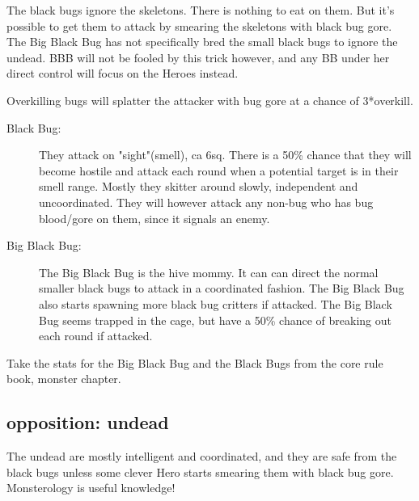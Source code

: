 The black bugs ignore the skeletons. There is nothing to eat on them. But it's possible to get them to attack by smearing the skeletons with black bug gore. The Big Black Bug has not specifically bred the small black bugs to ignore the undead. BBB will not be fooled by this trick however, and any BB under her direct control will focus on the Heroes instead.

Overkilling bugs will splatter the attacker with bug gore at a chance of 3*overkill.


\begin{description}

\item[Black Bug:] They attack on "sight"(smell), ca 6sq. There is a 50\% chance that they will become hostile and attack each round when a potential target is in their smell range. Mostly they skitter around slowly, independent and uncoordinated. They will however attack any non-bug who has bug blood/gore on them, since it signals an enemy.

\item[Big Black Bug:] The Big Black Bug is the hive mommy. It can can direct the normal smaller black bugs to attack in a coordinated fashion. The Big Black Bug also starts spawning more black bug critters if attacked. The Big Black Bug seems trapped in the cage, but have a 50\% chance of breaking out each round if attacked.

\end{description}

\noindent Take the stats for the Big Black Bug and the Black Bugs from the core rule book, monster chapter.


\subsection*{opposition: undead}

The undead are mostly intelligent and coordinated, and they are safe from the black bugs unless some clever Hero starts smearing them with black bug gore. Monsterology is useful knowledge!

